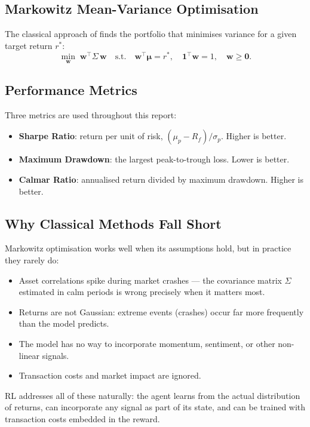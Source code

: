 \documentclass[12pt,a4paper]{article}
\begin{document}
\subsection{Markowitz Mean-Variance Optimisation}

The classical approach of \citet{markowitz1952} finds the portfolio
that minimises variance for a given target return $r^*$:
\begin{equation}
  \min_{\mathbf{w}}\; \mathbf{w}^{\!\top} \Sigma\, \mathbf{w}
  \quad \text{s.t.}\quad
  \mathbf{w}^{\!\top} \boldsymbol{\mu} = r^*,\quad
  \mathbf{1}^{\!\top}\mathbf{w} = 1,\quad \mathbf{w} \ge \mathbf{0}.
  \label{eq:markowitz}
\end{equation}

\subsection{Performance Metrics}

Three metrics are used throughout this report:
\begin{itemize}[nosep]
  \item \textbf{Sharpe Ratio}: return per unit of risk,
        $(\mu_p - R_f)/\sigma_p$. Higher is better.
  \item \textbf{Maximum Drawdown}: the largest peak-to-trough loss.
        Lower is better.
  \item \textbf{Calmar Ratio}: annualised return divided by maximum
        drawdown. Higher is better.
\end{itemize}

\subsection{Why Classical Methods Fall Short}

Markowitz optimisation works well when its assumptions hold, but in
practice they rarely do:
\begin{itemize}[nosep]
  \item Asset correlations spike during market crashes --- the
        covariance matrix $\Sigma$ estimated in calm periods is wrong
        precisely when it matters most.
  \item Returns are not Gaussian: extreme events (crashes) occur far
        more frequently than the model predicts.
  \item The model has no way to incorporate momentum, sentiment, or
        other non-linear signals.
  \item Transaction costs and market impact are ignored.
\end{itemize}
RL addresses all of these naturally: the agent learns from the actual
distribution of returns, can incorporate any signal as part of its
state, and can be trained with transaction costs embedded in the reward.
\end{document}
